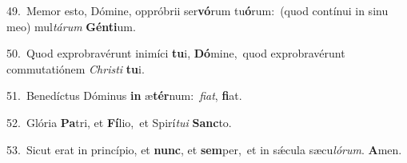 {\numbfont\textcolor{\numbcolor}{49.}}~Memor esto, Dómine, oppróbrii ser\-\textbf{vó}\-rum tu\-\textbf{ó}\-rum:~\star (quod contínui in sinu meo) mul\-\textit{tá}\-\textit{rum} \textbf{Gén}\-\textbf{ti}um.\par
{\numbfont\textcolor{\numbcolor}{50.}}~Quod exprobravérunt inimíci \textbf{tu}\-i, \textbf{Dó}\-mine,~\star quod exprobravérunt commutatiónem \textit{Chris}\-\textit{ti} \textbf{tu}\-i.\par
{\numbfont\textcolor{\numbcolor}{51.}}~Benedíctus Dóminus \textbf{in} æ\-\textbf{tér}\-num:~\star \textit{fi}\-\textit{at}, \textbf{fi}\-at.\par
{\numbfont\textcolor{\numbcolor}{52.}}~Glória \textbf{Pa}\-tri, et \textbf{Fí}\-lio,~\star et Spirí\-\textit{tu}\-\textit{i} \textbf{Sanc}\-to.\par
{\numbfont\textcolor{\numbcolor}{53.}}~Sicut erat in princípio, et \textbf{nunc}\-, et \textbf{sem}\-per,~\star et in sǽcula sæcu\-\textit{ló}\-\textit{rum}. \textbf{A}\-men.\par
